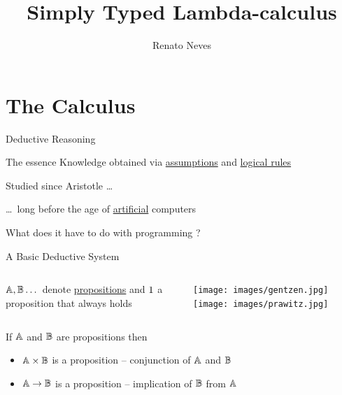 \documentclass{beamer}
\author[Renato Neves]{Renato Neves}
\date{}
\begin{document}
\title{Simply Typed Lambda-calculus}

\frame[plain]{\titlepage}

\section{The Calculus} 

\begin{frame}{Deductive Reasoning}

  \begin{block}{The essence}
          Knowledge obtained via \alert{\underline{assumptions}} and
          \alert{\underline{logical rules}}
  \end{block}

  \pause
  \bigskip
  Studied since Aristotle  \dots

  \dots \, long before the age of \alert{\underline{artificial}} computers

  What does it have to do with programming ?
\end{frame}

\begin{slide}{A Basic Deductive System}
  \begin{minipage}[0.3\textheight]{\textwidth}
  \begin{columns}[c]
  \begin{column}{0.5\textwidth}
          $\mathbb{A},\mathbb{B} \dots$ denote \alert{\underline{propositions}}
          and $1$ a proposition that always holds   
  \end{column}
  \begin{column}{0.45\textwidth}
        \texttt{[image: images/gentzen.jpg]}
        \texttt{[image: images/prawitz.jpg]}
  \end{column}
  \end{columns}
  \end{minipage}

  If $\mathbb{A}$ and $\mathbb{B}$ are propositions then
  \begin{itemize}
    \item $\mathbb{A} \times \mathbb{B}$ is a proposition -- 
        conjunction of $\mathbb{A}$ and $\mathbb{B}$
    \item $\mathbb{A} \to \mathbb{B}$ is a proposition -- 
            implication of $\mathbb{B}$ from $\mathbb{A}$
  \end{itemize}
  
\end{slide}
\end{document}
